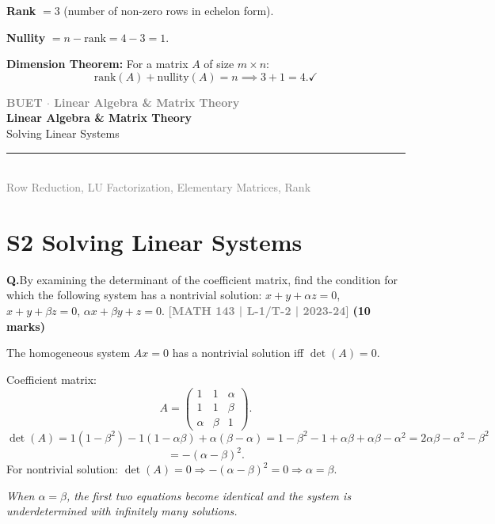 \documentclass[12pt,a3paper]{article}
\newcommand{\yr}[1]{\hfill\textcolor{gray}{\small\textbf{[#1]}}}
\newcommand{\mk}[1]{\textcolor{orange!70!black}{\small\textbf{(#1 marks)}}}
\newcommand{\secdivider}[4]{%
  \newpage\thispagestyle{empty}%
  \vspace*{\fill}%
  \begin{tcolorbox}[enhanced,colback=#4!7,colframe=#3,boxrule=1.5pt,arc=8pt,
    left=20pt,right=20pt,top=22pt,bottom=22pt,
    shadow={3pt}{-3pt}{0pt}{black!15}]
    \centering
    {\large\textcolor{gray}{\textbf{BUET $\cdot$ Linear Algebra \& Matrix Theory}}}\\[8pt]
    {\fontsize{26}{32}\selectfont\bfseries\textcolor{#3}{Linear Algebra \& Matrix Theory}}\\[6pt]
    {\fontsize{15}{19}\selectfont\textcolor{dgray}{#1}}\\[12pt]
    \textcolor{#3!60}{\rule{0.5\textwidth}{0.5pt}}\\[6pt]
    {\small\textcolor{gray}{#2}}
  \end{tcolorbox}%
  \vspace*{\fill}\newpage%
}
\newcounter{qnum}
\newcommand{\Q}[1]{%
  \needspace{4\baselineskip}
  \refstepcounter{qnum}
  \vspace{6pt}
  \noindent\textbf{Q\theqnum.}\enspace #1\par
}
\begin{document}
\begin{tcolorbox}
\textbf{Rank} $= 3$ (number of non-zero rows in echelon form).
 
\textbf{Nullity} $= n - \mathrm{rank} = 4 - 3 = 1$.
 
\textbf{Dimension Theorem:} For a matrix $A$ of size $m\times n$:
\[
\mathrm{rank}(A) + \mathrm{nullity}(A) = n \implies 3 + 1 = 4. \checkmark
\]
 
\end{tcolorbox}
 

\secdivider{Solving Linear Systems}{Row Reduction, LU Factorization, Elementary Matrices, Rank}{cB}{blue}

\label{sec:S2}
\section*{S2 \quad Solving Linear Systems}

\Q{By examining the determinant of the coefficient matrix, find the condition for which the following system has a nontrivial solution:
$x + y + \alpha z = 0$, \quad $x + y + \beta z = 0$, \quad $\alpha x + \beta y + z = 0$.
\yr{MATH 143 | L-1/T-2 | 2023-24} \mk{10}}

\begin{tcolorbox}[enhanced,breakable,
  colback=cB!4,colframe=cB,boxrule=0.8pt,arc=5pt,
  title={\textbf{Answer --- Condition for Nontrivial Solution}},
  fonttitle=\bfseries\color{white},colbacktitle=cB]

The homogeneous system $Ax=0$ has a nontrivial solution iff $\det(A)=0$.

Coefficient matrix:
\[
A = \begin{pmatrix}1&1&\alpha\\1&1&\beta\\\alpha&\beta&1\end{pmatrix}.
\]
\[
\det(A) = 1(1-\beta^2) - 1(1-\alpha\beta) + \alpha(\beta-\alpha)
= 1 - \beta^2 - 1 + \alpha\beta + \alpha\beta - \alpha^2
= 2\alpha\beta - \alpha^2 - \beta^2
\]
\[
= -(\alpha-\beta)^2.
\]
For nontrivial solution: $\det(A)=0 \Rightarrow -(\alpha-\beta)^2=0 \Rightarrow \boxed{\alpha=\beta}$.

\textit{When $\alpha=\beta$, the first two equations become identical and the system is underdetermined with infinitely many solutions.}

\end{tcolorbox}
\end{document}
